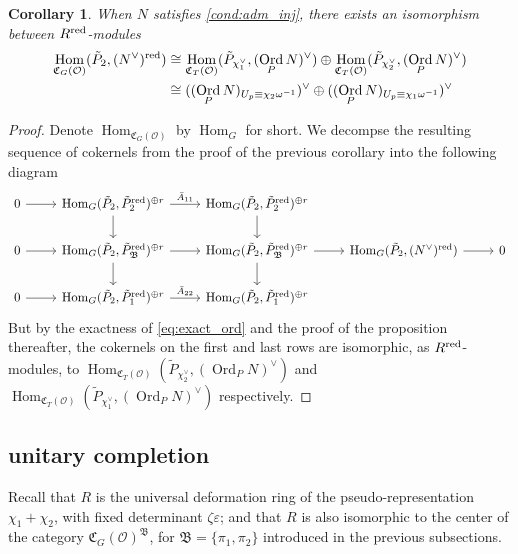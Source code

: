 \documentclass[leqno]{amsart}
\newcommand{\B}{\mathfrak B}
\newcommand{\fC}{\mathfrak C}
\DeclareMathOperator{\Ord}{Ord}
\newcommand{\red}{\textnormal{red}}
\newcommand{\oo}{\mathcal{O}} %
\DeclareMathOperator{\Hom}{Hom}
\newtheorem{cor}[thm]{Corollary}
\theoremstyle{definition}
\theoremstyle{remark}
\begin{document}
\begin{cor}
	When $N$ satisfies \eqref{cond:adm_inj}, 
	there exists an isomorphism between $R^{\red}$-modules
    \begin{align}
	    \Hom_{\fC_{G}(\oo)}(\tilde{P}_2,(N^\vee)^{\red})
	    &\cong
	    \Hom_{\fC_{T}(\oo)}(\tilde{P}_{\chi_1^\vee}, (\Ord_PN)^\vee)\oplus
	    \Hom_{\fC_{T}(\oo)}(\tilde{P}_{\chi_2^\vee},(\Ord_PN)^\vee)\\
	    &\cong
	    ((\Ord_PN)_{U_p\equiv \chi_2\omega^{-1}})^\vee\oplus
	    ((\Ord_PN)_{U_p\equiv \chi_1\omega^{-1}})^\vee
    \end{align}
\end{cor}
\begin{proof}
	Denote $\Hom_{\fC_{G}(\oo)}$ by $\Hom_G$ for short.
	We decompse the resulting sequence of cokernels
	from the proof of the previous corollary into the following diagram
\begin{equation*}
    \begin{tikzcd}
	    0 \arrow[r]& \Hom_{G}(\tilde{P}_2, \tilde{P}_2^{\red})^{\oplus r}
	    \arrow[r,"\bar{A}_{11}"] \arrow[d]&
	    \Hom_{G}(\tilde{P}_2, \tilde{P}_2^{\red})^{\oplus r}
	    \arrow[d] &&\\
	    0\arrow[r] & \Hom_{G}(\tilde{P}_2, \tilde{P}_\B^{\red})^{\oplus r}
	    \arrow[r] 
	    \arrow[d] &
	    \Hom_{G}(\tilde{P}_2, \tilde{P}_\B^{\red})^{\oplus r}
	    \arrow[d] \arrow[r]&
	    \Hom_{G}(\tilde{P}_2, (N^\vee)^{\red})\arrow[r]&0\\
	    0\arrow[r] & \Hom_{G}(\tilde{P}_2, \tilde{P}_1^{\red})^{\oplus r}
	    \arrow[r,"\bar{A}_{22}"] &
	    \Hom_{G}(\tilde{P}_2, \tilde{P}_1^{\red})^{\oplus r}&&
    \end{tikzcd}
\end{equation*}
But by the exactness of \eqref{eq:exact_ord}
and the proof of the proposition thereafter,
the cokernels on the first and last rows
are isomorphic, as  $R^{\red}$-modules,
to $\Hom_{\fC_T(\oo)}(\tilde{P}_{\chi_2^\vee}, (\Ord_PN)^\vee)$ and
$\Hom_{\fC_T(\oo)}(\tilde{P}_{\chi_1^\vee}, (\Ord_PN)^\vee)$ respectively.
\end{proof}  

\subsection{unitary completion}

Recall that $R$ is the universal deformation ring
of the pseudo-representation
$\chi_1+\chi_2$, with fixed determinant  $\zeta\varepsilon$;
and that  $R$
is also isomorphic to the center
of the category  $\fC_G(\oo)^\B$,
for  $\B=\{\pi_1,\pi_2\}$ 
introduced in the previous subsections.
\end{document}
